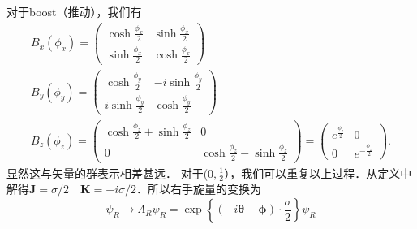 对于boost（推动），我们有
\begin{equation}
\begin{array}{c}
B_{x}\left(\phi_{x}\right)=\left(\begin{array}{cc}
\cosh \frac{\phi_{x}}{2} & \sinh \frac{\phi_{x}}{2} \\
\sinh \frac{\phi_{x}}{2} & \cosh \frac{\phi_{x}}{2}
\end{array}\right) \\
B_{y}\left(\phi_{y}\right)=\left(\begin{array}{cc}
\cosh \frac{\phi_{y}}{2} & -i \sinh \frac{\phi_{y}}{2} \\
i \sinh \frac{\phi_{y}}{2} & \cosh \frac{\phi_{y}}{2}
\end{array}\right) \\
B_{z}\left(\phi_{z}\right)=\left(\begin{array}{cc}
\cosh \frac{\phi_{z}}{2}+\sinh \frac{\phi_{z}}{2} & 0 \\
0 & \cosh \frac{\phi_{z}}{2}-\sinh \frac{\phi_{z}}{2}
\end{array}\right)=\left(\begin{array}{cc}
e^{\frac{\phi_{z}}{2}} & 0 \\
0 & e^{-\frac{\phi_{z}}{2}}
\end{array}\right) .
\end{array}
\end{equation}
显然这与矢量的群表示相差甚远．
对于($0,\frac{1}{2}$），我们可以重复以上过程．从定义中解得$\mathbf{J}=\sigma / 2 \quad \mathbf{K}=-i \sigma / 2$．所以右手旋量的变换为
\begin{equation}
\psi_{R} \rightarrow \Lambda_{R} \psi_{R}=\exp \left\{(-i \boldsymbol{\theta}+\boldsymbol{\phi}) \cdot \frac{\sigma}{2}\right\} \psi_{R}
\end{equation}

